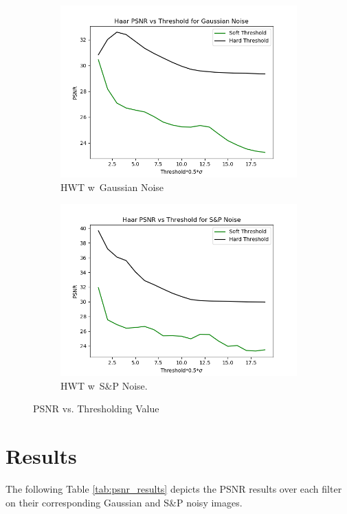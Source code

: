 \documentclass{article}\raggedbottom
\begin{document}
\begin{figure}[H]
	\begin{subfigure}[b]{0.45\linewidth}
		\includegraphics[width=\linewidth]{../../1_Resources/images/HWT_threshold_g.png}
		\caption{HWT w\ Gaussian Noise}
	\end{subfigure}
	\begin{subfigure}[b]{0.45\linewidth}
		\includegraphics[width=\linewidth]{../../1_Resources/images/HWT_threshold_sp.png}
		\caption{HWT w\ S\&P Noise.}
	\end{subfigure}	
	\caption{PSNR vs. Thresholding Value}
	\label{fig:psnr_threshold}
\end{figure}


\section{Results}\raggedbottom
The following Table \ref{tab:psnr_results} depicts the PSNR results over each filter on their corresponding Gaussian and S\&P noisy images.
\end{document}
